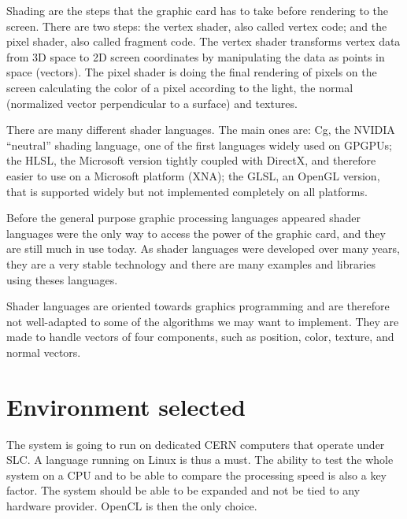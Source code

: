 Shading are the steps that the graphic card has to take before rendering to the screen. There are two steps: the vertex shader, also called vertex code; and the pixel shader, also called fragment code. The vertex shader transforms vertex data from 3D space to 2D screen coordinates by manipulating the data as points in space (vectors). The pixel shader is doing the final rendering of pixels on the screen calculating the color of a pixel according to the light, the normal (normalized vector perpendicular to a surface) and textures. 

There are many different shader languages. The main ones are: Cg, the NVIDIA ``neutral'' shading language, one of the first languages widely used on \glspl{GPGPU}; the \gls{HLSL}, the Microsoft version tightly coupled with DirectX, and therefore easier to use on a Microsoft platform (XNA); the \gls{GLSL}, an \gls{OpenGL} version, that is supported widely but not implemented completely on all platforms. 

Before the general purpose graphic processing languages appeared shader languages were the only way to access the power of the graphic card, and they are still much in use today. As shader languages were developed over many years, they are a very stable technology and there are many examples and libraries using theses languages.

Shader languages are oriented towards graphics programming and are therefore not well-adapted to some of the algorithms we may want to implement. They are made to handle vectors of four components, such as position, color, texture, and normal vectors.

\section{Environment selected}

The system is going to run on dedicated \gls{CERN} computers that operate under \gls{SLC}. A language running on Linux is thus a must. The ability to test the whole system on a \gls{CPU} and to be able to compare the processing speed is also a key factor. The system should be able to be expanded and not be tied to any hardware provider. \Gls{OpenCL} is then the only choice.

